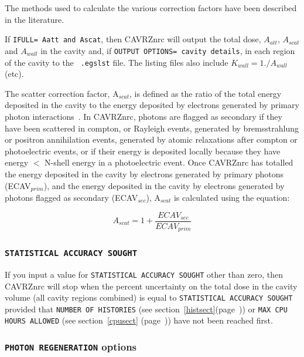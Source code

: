 \documentclass[12pt,twoside]{article}  %
\newcommand{\lpage}[1]{(page~\pageref{#1})}
\newcommand{\note}[1]{\mbox{}\\ \noindent \rule{16cm}{0.5mm} \\
{\em #1} \\ \noindent \rule{16cm}{0.5mm}\\
\typeout{******note: #1 *****}
}
\begin{document}
The methods used to calculate the various correction factors have been
described in the literature\cite{Bi85,Ro85a,Bi86,RB90a}.

If {\tt IFULL= Aatt and Ascat}, then CAVRZnrc will output the total dose,
$A_{att}$, $A_{scat}$ and $A_{wall}$ in the cavity and, if {\tt OUTPUT
OPTIONS= cavity details}, in each region of the cavity to the {\tt
.egslst} file. The listing files also include $K_{wall} = 1./A_{wall}$
(etc).

The scatter correction factor, A$_{scat}$, is defined as the ratio of the
total energy deposited in the cavity to the energy deposited by electrons
generated by primary photon interactions~\cite{Bi86}.  In CAVRZnrc,
photons are flagged as secondary if they have been scattered in compton,
or Rayleigh events, generated by bremsstrahlung or positron annihilation
events, generated by atomic relaxations after compton or photoelectric
events, or if their energy is deposited locally because they have
energy $<$ N-shell energy in a photoelectric event.  Once CAVRZnrc has
totalled the energy deposited in the cavity by electrons generated by
primary photons (ECAV$_{prim}$), and the energy deposited in the cavity
by electrons generated by photons flagged as secondary (ECAV$_{sec}$),
A$_{scat}$ is calculated using the equation:

\begin{equation}
A_{scat}=1+\frac{ECAV_{sec}}{ECAV_{prim}}
\end{equation}

\subsubsection{{\tt STATISTICAL ACCURACY SOUGHT}}

If you input a value for {\tt STATISTICAL ACCURACY SOUGHT}
other than zero, then CAVRZnrc will stop when the percent uncertainty on the 
total dose in the cavity volume (all cavity regions combined) is equal 
to {\tt STATISTICAL ACCURACY SOUGHT} provided that 
{\tt NUMBER OF HISTORIES} (see section~\ref{histsect}\lpage{histsect})
or {\tt MAX CPU HOURS ALLOWED} (see section~\ref{cpusect} \lpage{cpusect}) have
not been reached first.

\subsubsection{{\tt PHOTON REGENERATION} options}
\end{document}
